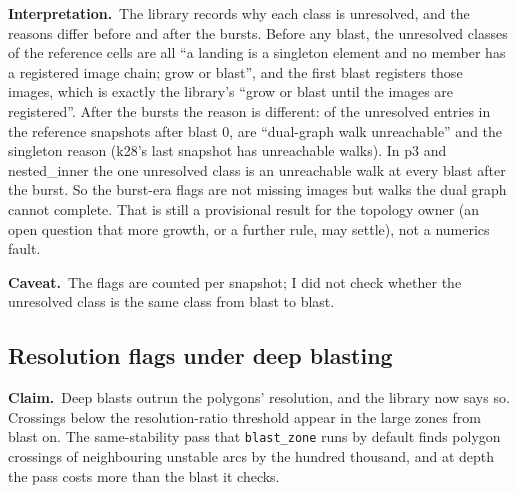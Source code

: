 \documentclass[11pt,a4paper]{article}
\newcommand{\claim}{\par\smallskip\noindent\textbf{Claim.}~}
\newcommand{\reading}{\par\smallskip\noindent\textbf{Interpretation.}~}
\newcommand{\caveat}{\par\smallskip\noindent\textbf{Caveat.}~}
\newcommand{\code}[1]{\texttt{#1}}
\begin{document}
\reading The library records why each class is unresolved, and the
reasons differ before and after the bursts. Before any blast, the
\NumDeepUnresolvedSingletonStart{} unresolved classes of the reference cells
are all ``a landing is a singleton element and no member has a registered
image chain; grow or blast'', and the first blast registers those images,
which is exactly the library's ``grow or blast until the images are
registered''. After the bursts the reason is different: of the
unresolved entries in the reference snapshots after blast 0,
\NumDeepUnresolvedUnreachable{} are ``dual-graph walk unreachable'' and
\NumDeepUnresolvedSingleton{} the singleton reason (k28's last snapshot has
\NumDeepUnresolvedUnreachableEndKTwoEight{} unreachable walks). In p3 and
nested\_inner the one unresolved class is an unreachable walk at every blast
after the burst. So the burst-era flags are not missing images but walks the
dual graph cannot complete. That is still a
provisional result for the topology owner (an open question that more
growth, or a further rule, may settle), not a numerics fault.

\caveat The flags are counted per snapshot; I did not check whether the
unresolved class is the same class from blast to blast.

\subsection{Resolution flags under deep blasting}
\label{sec:blastdepth-resolution}

\claim Deep blasts outrun the polygons' resolution, and the library now says
so. Crossings below the resolution-ratio threshold appear in the large zones
from blast \NumDeepFirstUnresolvedKTwoEight{} on. The same-stability pass
that \code{blast\_zone} runs by default finds polygon crossings of
neighbouring unstable arcs by the hundred thousand, and at depth the pass
costs more than the blast it checks.
\end{document}
